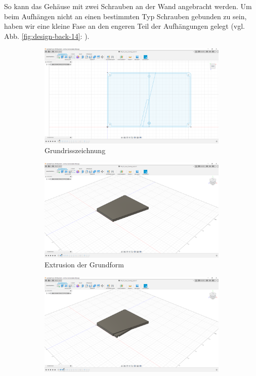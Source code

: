 So kann das Gehäuse mit zwei Schrauben an der Wand angebracht werden.  
Um beim Aufhängen nicht an einen bestimmten Typ Schrauben gebunden zu sein, haben wir eine kleine Fase an den engeren Teil der Aufhängungen gelegt (vgl. Abb. \ref{fig:design-back-14}: ). 
\begin{figure}[H]
	\begin{subfigure}[t]{.3\linewidth}
		\includegraphics[width=\linewidth]{img/konstruktion_gehaeuse_hinten_001.png}
		\caption[Grundrisszeichnung]{Grundrisszeichnung}
		\label{fig:design-back-01}
	\end{subfigure}	
	\begin{subfigure}[t]{.3\linewidth}
		\includegraphics[width=\linewidth]{img/konstruktion_gehaeuse_hinten_002.png}
		\caption[Extrusion der Grundform]{Extrusion der Grundform}
		\label{fig:design-back-02}
	\end{subfigure}
	\begin{subfigure}[t]{.3\linewidth}
		\includegraphics[width=\linewidth]{img/konstruktion_gehaeuse_hinten_003.png}

\end{subfigure}
\end{figure}
